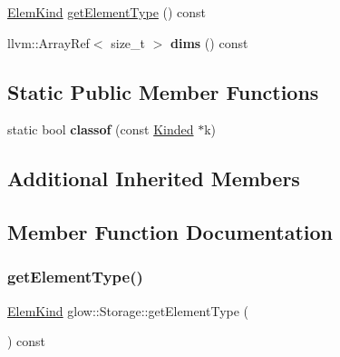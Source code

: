 \textbf{ }\par
\begin{DoxyCompactItemize}
\item 
\hyperlink{namespaceglow_ab92e14a94329daf4083db670e95fbcdf}{Elem\+Kind} \hyperlink{classglow_1_1_storage_a837ab9786696a0dee6ecb76b6d4ea546}{get\+Element\+Type} () const
\item 
\mbox{\label{classglow_1_1_storage_af10d5eba2cfd183b33903e0e50f49773}} 
llvm\+::\+Array\+Ref$<$ size\+\_\+t $>$ {\bfseries dims} () const
\end{DoxyCompactItemize}

\subsection*{Static Public Member Functions}
\begin{DoxyCompactItemize}
\item 
\mbox{\label{classglow_1_1_storage_a6e1c8b8ced427583760c1019edaecec1}} 
static bool {\bfseries classof} (const \hyperlink{classglow_1_1_kinded}{Kinded} $\ast$k)
\end{DoxyCompactItemize}
\subsection*{Additional Inherited Members}


\subsection{Member Function Documentation}
\mbox{\label{classglow_1_1_storage_a837ab9786696a0dee6ecb76b6d4ea546}} 
\subsubsection{\texorpdfstring{get\+Element\+Type()}{getElementType()}}
{\footnotesize\ttfamily \hyperlink{namespaceglow_ab92e14a94329daf4083db670e95fbcdf}{Elem\+Kind} glow\+::\+Storage\+::get\+Element\+Type (\begin{DoxyParamCaption}{ }\end{DoxyParamCaption}) const\hspace{0.3cm}{\ttfamily [inline]}}

